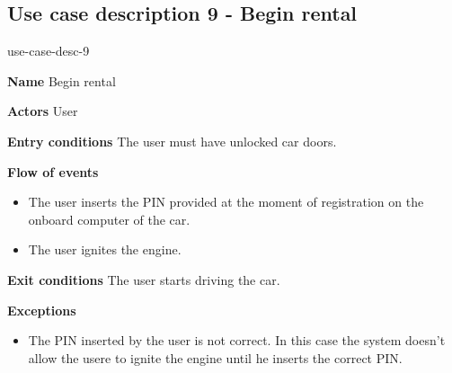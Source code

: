 \subsection{Use case description 9 - Begin rental}
\begin{labeling}{use-case-desc-9}
		\item[\textbf{Name}] Begin rental
		\item[\textbf{Actors}] User
		\item[\textbf{Entry conditions}] The user must have unlocked car doors.
		\item[\textbf{Flow of events}]
			\begin{itemize}
				\item[]
				\item The user inserts the PIN provided at the moment of registration on the onboard computer of the car.
				\item The user ignites the engine.
			\end{itemize}
		\item[\textbf{Exit conditions}] The user starts driving the car.
		\item[\textbf{Exceptions}]
			\begin{itemize}
				\item[]
				\item The PIN inserted by the user is not correct. In this case the system doesn't allow the usere to ignite the engine until he inserts the correct PIN. 
			\end{itemize}
	\end{labeling}
	
